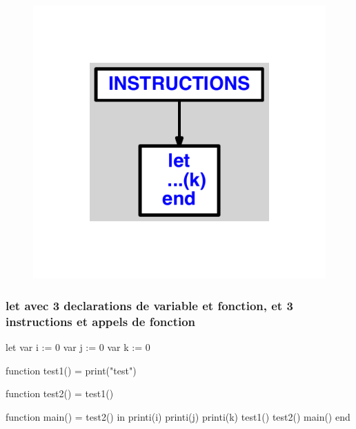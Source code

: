 \documentclass{article}
\begin{document}
\begin{figure}[H]\centering\includegraphics[max width=\textwidth]{ast/ast_268.pdf}\end{figure}\subsubsection{let avec 3 declarations de variable et fonction, et 3 instructions et appels de fonction}
\begin{verbatimtab}
let
	var i := 0
	var j := 0
	var k := 0

	function test1() = print("test")

	function test2() = test1()

	function main() = test2()
in
	printi(i)
	printi(j)
	printi(k)
	test1()
	test2()
	main()
end
\end{verbatimtab}
\end{document}

